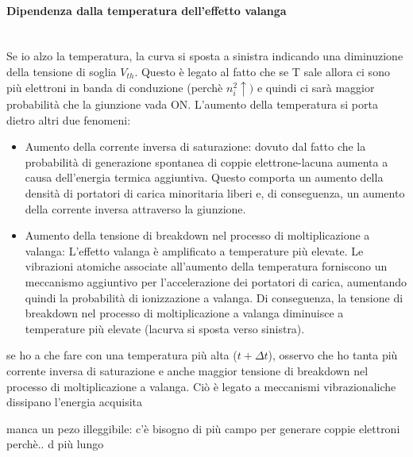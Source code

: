 \paragraph{Dipendenza dalla temperatura dell'effetto valanga}\mbox{}\\
Se io alzo la temperatura, la curva si sposta a sinistra indicando una diminuzione della tensione di soglia $V_{th}$. Questo è legato al fatto che se T sale allora ci sono più elettroni in banda di conduzione (perchè $n_i^2 \uparrow)$ e quindi ci sarà maggior probabilità che la giunzione vada ON.
L'aumento della temperatura si porta dietro altri due fenomeni:
\begin{itemize}
    \item Aumento della corrente inversa di saturazione: dovuto dal fatto che la probabilità di generazione spontanea di coppie elettrone-lacuna aumenta a causa dell'energia termica aggiuntiva. Questo comporta un aumento della densità di portatori di carica minoritaria liberi e, di conseguenza, un aumento della corrente inversa attraverso la giunzione. 
    \item Aumento della tensione di breakdown nel processo di moltiplicazione a valanga: L'effetto valanga è amplificato a temperature più elevate. Le vibrazioni atomiche associate all'aumento della temperatura forniscono un meccanismo aggiuntivo per l'accelerazione dei portatori di carica, aumentando quindi la probabilità di ionizzazione a valanga. Di conseguenza, la tensione di breakdown nel processo di moltiplicazione a valanga diminuisce a  temperature più elevate (lacurva si sposta verso sinistra).
\end{itemize}se ho a che fare con una temperatura più alta ($t+\Delta t$), osservo che ho tanta più corrente inversa di saturazione e anche maggior tensione di breakdown nel processo di moltiplicazione a valanga. Ciò è legato a meccanismi vibrazionaliche dissipano l'energia acquisita
%
\begin{ricevimento}
    manca un pezo illeggibile:
    c'è bisogno di più campo per generare coppie elettroni perchè.. d più lungo
\end{ricevimento}
%
